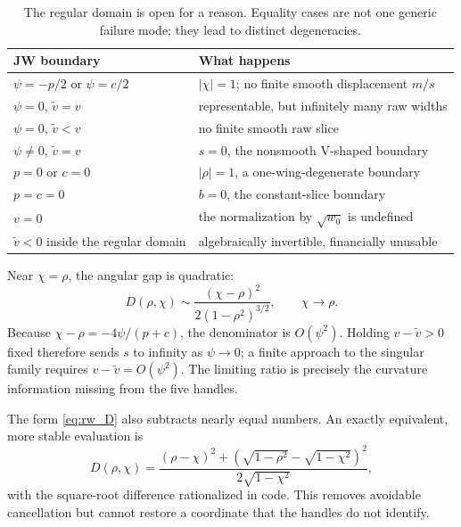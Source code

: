 \documentclass[11pt]{article}
\newcommand{\vmin}{\widetilde v}
\begin{document}
\begin{table}[H]
\centering
\small
\begin{tabular}{@{}p{}p{}@{}}
\toprule
JW boundary & What happens\\
\midrule
$\psi=-p/2$ or $\psi=c/2$ & $|\chi|=1$; no finite smooth displacement $m/s$\\
$\psi=0$, $\vmin=v$ & representable, but infinitely many raw widths\\
$\psi=0$, $\vmin<v$ & no finite smooth raw slice\\
$\psi\ne0$, $\vmin=v$ & $s=0$, the nonsmooth V-shaped boundary\\
$p=0$ or $c=0$ & $|\rho|=1$, a one-wing-degenerate boundary\\
$p=c=0$ & $b=0$, the constant-slice boundary\\
$v=0$ & the normalization by $\sqrt{w_0}$ is undefined\\
$\vmin<0$ inside the regular domain & algebraically invertible, financially unusable\\
\bottomrule
\end{tabular}
\caption{The regular domain is open for a reason.  Equality cases are not one
generic failure mode; they lead to distinct degeneracies.}
\label{tab:rw_boundaries}
\end{table}

Near $\chi=\rho$, the angular gap is quadratic:
\begin{equation}
D(\rho,\chi)
\sim \frac{(\chi-\rho)^2}{2(1-\rho^2)^{3/2}},
\qquad \chi\to\rho.
\label{eq:rw_D_asymptotic}
\end{equation}
Because $\chi-\rho=-4\psi/(p+c)$, the denominator is $O(\psi^2)$.
Holding $v-\vmin>0$ fixed therefore sends $s$ to infinity as
$\psi\to0$; a finite approach to the singular family requires
$v-\vmin=O(\psi^2)$.  The limiting ratio is precisely the curvature
information missing from the five handles.

The form \eqref{eq:rw_D} also subtracts nearly equal numbers.  An exactly
equivalent, more stable evaluation is
\begin{equation}
D(\rho,\chi)=
\frac{(\rho-\chi)^2+
\left(\sqrt{1-\rho^2}-\sqrt{1-\chi^2}\right)^2}
{2\sqrt{1-\chi^2}},
\label{eq:rw_D_stable}
\end{equation}
with the square-root difference rationalized in code.  This removes avoidable
cancellation but cannot restore a coordinate that the handles do not identify.
\end{document}
